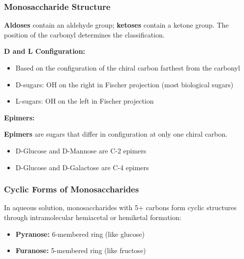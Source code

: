 \subsubsection{Monosaccharide Structure}

\begin{definition}
\textbf{Aldoses} contain an aldehyde group; \textbf{ketoses} contain a ketone group. The position of the carbonyl determines the classification.
\end{definition}

\textbf{D and L Configuration:}
\begin{itemize}
    \item Based on the configuration of the chiral carbon farthest from the carbonyl
    \item D-sugars: OH on the right in Fischer projection (most biological sugars)
    \item L-sugars: OH on the left in Fischer projection
\end{itemize}

\textbf{Epimers:}
\begin{definition}
\textbf{Epimers} are sugars that differ in configuration at only one chiral carbon.
\end{definition}

\begin{example}
\begin{itemize}
    \item D-Glucose and D-Mannose are C-2 epimers
    \item D-Glucose and D-Galactose are C-4 epimers
\end{itemize}
\end{example}

\subsubsection{Cyclic Forms of Monosaccharides}

\begin{definition}
In aqueous solution, monosaccharides with 5+ carbons form cyclic structures through intramolecular hemiacetal or hemiketal formation:
\begin{itemize}
    \item \textbf{Pyranose:} 6-membered ring (like glucose)
    \item \textbf{Furanose:} 5-membered ring (like fructose)
\end{itemize}
\end{definition}

